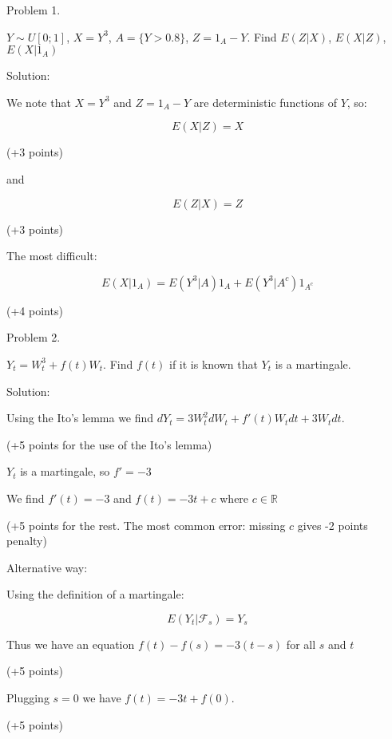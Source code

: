 \documentclass[pdftex,12pt,a4paper]{article}
\begin{document}



Problem 1.

$ Y\sim U[0;1] $, $ X=Y^{3} $, $ A=\{Y>0.8\} $, $ Z=1_{A}-Y $. Find $ E(Z|X) $, $ E(X|Z) $, $ E(X|1_{A}) $

Solution:

We note that $ X=Y^{3} $ and $ Z=1_{A}-Y $ are deterministic functions of $ Y $, so:

\[ E(X|Z)=X \]

(+3 points)

and

\[ E(Z|X)=Z \]

(+3 points)


The most difficult:

\[E(X|1_{A})=E(Y^{3}|A)1_{A}+E(Y^{3}|A^{c})1_{A^{c}}\]

(+4 points)


\newpage
Problem 2.

$ Y_{t}=W_{t}^{3}+f(t)W_{t} $. Find $ f(t) $ if it is known that $ Y_{t} $ is a martingale.

Solution:

Using the Ito's lemma we find $ dY_{t}=3W_{t}^{2}dW_{t}+f'(t)W_{t}dt+ 3W_{t}dt$.

(+5 points for the use of the Ito's lemma)

$ Y_{t} $ is a martingale, so $ f'=-3 $

We find $ f'(t)=-3 $ and $ f(t)=-3t+c $ where $ c\in \mathbb{R} $

(+5 points for the rest. The most common error: missing $c$ gives -2 points penalty)


Alternative way:

Using the definition of a martingale:

\[E(Y_{t}|\mathcal{F}_{s})=Y_{s}\]

Thus we have an equation $ f(t)-f(s)=-3(t-s) $ for all $s$ and $t$

(+5 points)

Plugging $s=0$ we have $ f(t)=-3t+f(0)$.

(+5 points)


\newpage
\end{document}
